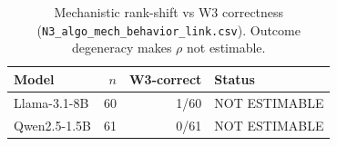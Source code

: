\begin{table}[t]
\centering
\small
\caption{Mechanistic rank-shift vs W3 correctness
(\texttt{N3\_algo\_mech\_behavior\_link.csv}). Outcome degeneracy makes
$\rho$ not estimable.}
\label{tab:n3}
\begin{tabular}{lrrl}
\toprule
Model & $n$ & W3-correct & Status \\
\midrule
Llama-3.1-8B & 60 & 1/60 & NOT ESTIMABLE \\
Qwen2.5-1.5B & 61 & 0/61 & NOT ESTIMABLE \\
\bottomrule
\end{tabular}
\end{table}
